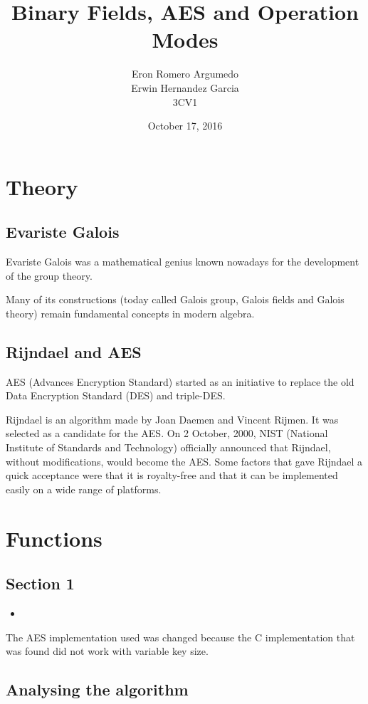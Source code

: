 \documentclass[titlepage, 12pt]{article}
\title{Binary Fields, AES and Operation Modes}
\author{Eron Romero Argumedo\\Erwin Hernandez Garcia\\3CV1}
\date{October 17, 2016}
\numberwithin{equation}{section}%
\numberwithin{figure}{section}%
\numberwithin{table}{section}%
\newcommand{\codescript}[4][]{
	\begin{itemize}
		\item[]
	\end{itemize}
}
\begin{document}
	\maketitle
	\tableofcontents
	\listoffigures
	\newpage
	\section{Theory}
	
	\subsection{Evariste Galois}
	
	Evariste Galois was a mathematical genius known nowadays for the development of the group theory. \medskip

	Many of its constructions (today called Galois group, Galois fields and Galois theory) remain fundamental concepts in modern algebra.\cite{galois}
	
	
	\subsection{Rijndael and AES}
	
	AES (Advances Encryption Standard) started as an initiative to replace the old Data Encryption Standard (DES) and triple-DES. \medskip
	
	Rijndael is an algorithm made by Joan Daemen and Vincent Rijmen. It was selected as a candidate for the AES. On 2 October, 2000, NIST (National Institute of Standards and Technology) officially announced that Rijndael, without modifications, would become the AES. Some factors that gave Rijndael a quick acceptance were that it is royalty-free and that it can be implemented easily on a wide range of platforms. \cite{rijndael}
	
	\section{Functions}
	\subsection{Section 1}
		\codescript{lisp}{Section1Code/aes-implementation}{Obtaining the keys for AES}
		The AES implementation used was changed because the C implementation that was found did not work with variable key size.
	
	\subsection{Analysing the algorithm}
		
\end{document}
